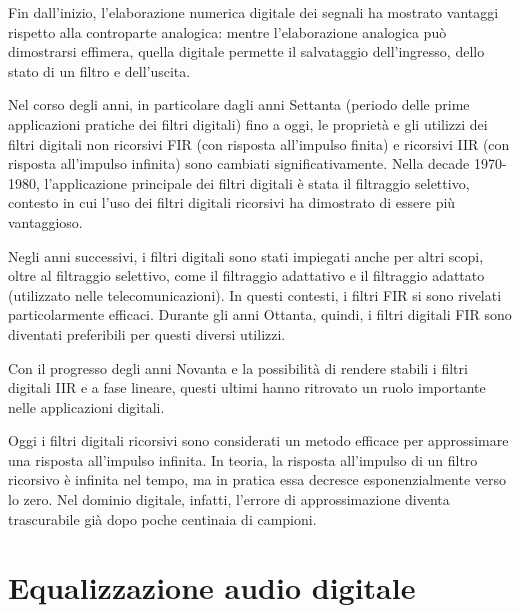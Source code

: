 \documentclass[12pt]{report}
\begin{document}
Fin dall'inizio, l'elaborazione numerica digitale dei segnali ha mostrato vantaggi rispetto alla controparte analogica: mentre l’elaborazione analogica può dimostrarsi effimera, quella digitale permette il salvataggio dell'ingresso, dello stato di un filtro e dell'uscita.

Nel corso degli anni, in particolare dagli anni Settanta (periodo delle prime applicazioni pratiche dei filtri digitali) fino a oggi, le proprietà e gli utilizzi dei filtri digitali non ricorsivi FIR (con risposta all’impulso finita) e ricorsivi IIR (con risposta all’impulso infinita) sono cambiati significativamente. Nella decade 1970-1980, l’applicazione principale dei filtri digitali è stata il filtraggio selettivo, contesto in cui l’uso dei filtri digitali ricorsivi ha dimostrato di essere più vantaggioso.

Negli anni successivi, i filtri digitali sono stati impiegati anche per altri scopi, oltre al filtraggio selettivo, come il filtraggio adattativo e il filtraggio adattato (utilizzato nelle telecomunicazioni). In questi contesti, i filtri FIR si sono rivelati particolarmente efficaci. Durante gli anni Ottanta, quindi, i filtri digitali FIR sono diventati preferibili per questi diversi utilizzi.

Con il progresso degli anni Novanta e la possibilità di rendere stabili i filtri digitali IIR e a fase lineare, questi ultimi hanno ritrovato un ruolo importante nelle applicazioni digitali.

Oggi i filtri digitali ricorsivi sono considerati un metodo efficace per approssimare una risposta all’impulso infinita. In teoria, la risposta all’impulso di un filtro ricorsivo è infinita nel tempo, ma in pratica essa decresce esponenzialmente verso lo zero. Nel dominio digitale, infatti, l’errore di approssimazione diventa trascurabile già dopo poche centinaia di campioni.

\section{Equalizzazione audio digitale}
\end{document}

